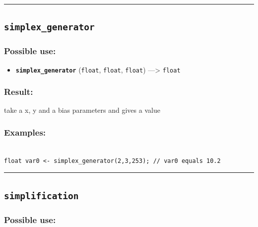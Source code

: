 \documentclass[]{book}
\providecommand{\tightlist}{%
  \setlength{\itemsep}{0pt}\setlength{\parskip}{0pt}}
\theoremstyle{definition}
\theoremstyle{definition}
\theoremstyle{definition}
\theoremstyle{remark}
\begin{document}
\begin{center}\rule{0.5\linewidth}{\linethickness}\end{center}

\subsection{\texorpdfstring{\texttt{simplex\_generator}}{simplex\_generator}}\label{simplex_generator}

\subsubsection{Possible use:}\label{possible-use-474}

\begin{itemize}
\tightlist
\item
  \textbf{\texttt{simplex\_generator}} (\texttt{float}, \texttt{float},
  \texttt{float}) ---\textgreater{} \texttt{float}
\end{itemize}

\subsubsection{Result:}\label{result-458}

take a x, y and a bias parameters and gives a value

\subsubsection{Examples:}\label{examples-330}

\begin{verbatim}
 
float var0 <- simplex_generator(2,3,253); // var0 equals 10.2
\end{verbatim}

\begin{center}\rule{0.5\linewidth}{\linethickness}\end{center}

\subsection{\texorpdfstring{\texttt{simplification}}{simplification}}\label{simplification}

\subsubsection{Possible use:}\label{possible-use-475}
\end{document}

